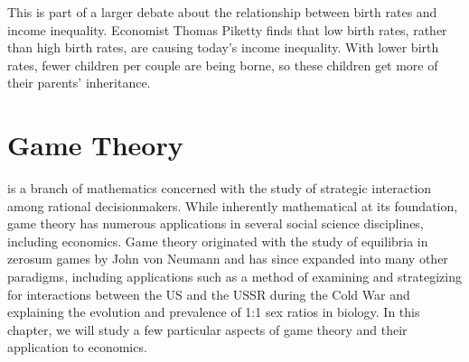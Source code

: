 \documentclass[letterpaper,10pt,english]{jupyterBook}
\begin{document}
\sphinxAtStartPar
This is part of a larger debate about the relationship between birth rates and income inequality. Economist Thomas Piketty finds that low birth rates, rather than high birth rates, are causing today’s income inequality. With lower birth rates, fewer children per couple are being borne, so these children get more of their parents’ inheritance.


\section{Game Theory}
\label{\detokenize{content/07-game-theory/index:game-theory}}\label{\detokenize{content/07-game-theory/index::doc}}
\sphinxAtStartPar
{} is a branch of mathematics concerned with the study of strategic interaction among rational decision\sphinxhyphen{}makers. While inherently mathematical at its foundation, game theory has numerous applications in several social science disciplines, including economics. Game theory originated with the study of equilibria in zero\sphinxhyphen{}sum games by John von Neumann and has since expanded into many other paradigms, including applications such as a method of examining and strategizing for interactions between the US and the USSR during the Cold War and explaining the evolution and prevalence of 1:1 sex ratios in biology. In this chapter, we will study a few particular aspects of game theory and their application to economics.
\end{document}
